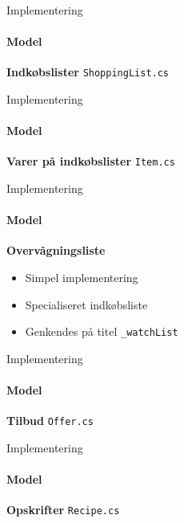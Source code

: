 \begin{frame}{Implementering}
	\framesubtitle{Model}
	\textbf{Indkøbslister} \texttt{ShoppingList.cs}
		
\end{frame}
\begin{frame}{Implementering}
	\framesubtitle{Model}	
	\textbf{Varer på indkøbslister} \texttt{Item.cs}
		
\end{frame}
\begin{frame}{Implementering}
	\framesubtitle{Model}
	\textbf{Overvågningsliste}
	\begin{itemize}
		\item Simpel implementering
		\item Specialiseret indkøbsliste
		\item Genkendes på titel  \texttt{\_watchList}
	\end{itemize}
\end{frame}
\begin{frame}{Implementering}
	\framesubtitle{Model}
	\textbf{Tilbud} \texttt{Offer.cs}
		
\end{frame}
\begin{frame}{Implementering}
	\framesubtitle{Model}
	\textbf{Opskrifter} \texttt{Recipe.cs}
		
\end{frame}

